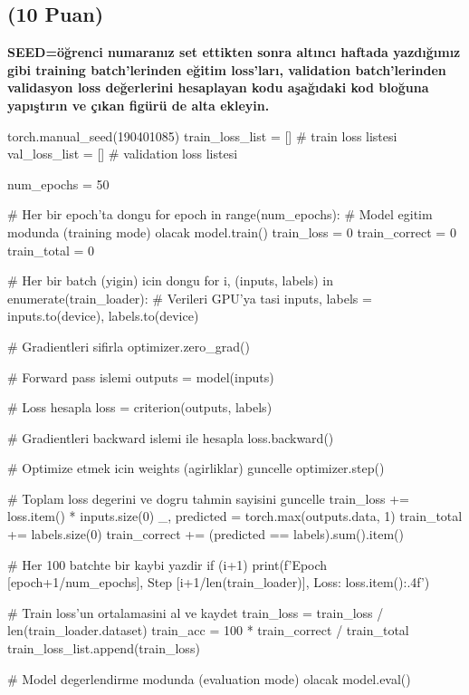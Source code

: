 \documentclass[11pt]{article}
\begin{document}
\subsection{(10 Puan)} \textbf{SEED=öğrenci numaranız set ettikten sonra altıncı haftada yazdığımız gibi training batch'lerinden eğitim loss'ları, validation batch'lerinden validasyon loss değerlerini hesaplayan kodu aşağıdaki kod bloğuna yapıştırın ve çıkan figürü de alta ekleyin.}
\vspace{.3in}
\begin{python}
torch.manual_seed(190401085)
train_loss_list = [] # train loss listesi
val_loss_list = [] # validation loss listesi

num_epochs = 50

# Her bir epoch'ta dongu
for epoch in range(num_epochs):
    # Model egitim modunda (training mode) olacak
    model.train()
    train_loss = 0
    train_correct = 0
    train_total = 0

    # Her bir batch (yigin) icin dongu
    for i, (inputs, labels) in enumerate(train_loader):
        # Verileri GPU'ya tasi
        inputs, labels = inputs.to(device), labels.to(device)

        # Gradientleri sifirla
        optimizer.zero_grad()

        # Forward pass islemi
        outputs = model(inputs)

        # Loss hesapla
        loss = criterion(outputs, labels)

        # Gradientleri backward islemi ile hesapla
        loss.backward()

        # Optimize etmek icin weights (agirliklar) guncelle
        optimizer.step()

        # Toplam loss degerini ve dogru tahmin sayisini guncelle
        train_loss += loss.item() * inputs.size(0)
        _, predicted = torch.max(outputs.data, 1)
        train_total += labels.size(0)
        train_correct += (predicted == labels).sum().item()

        # Her 100 batchte bir kaybi yazdir
        if (i+1) %
            print(f'Epoch [{epoch+1}/{num_epochs}], Step [{i+1}/{len(train_loader)}], Loss: {loss.item():.4f}')

    # Train loss'un ortalamasini al ve kaydet
    train_loss = train_loss / len(train_loader.dataset)
    train_acc = 100 * train_correct / train_total
    train_loss_list.append(train_loss)

    # Model degerlendirme modunda (evaluation mode) olacak
    model.eval()


\end{python}
\end{document}
